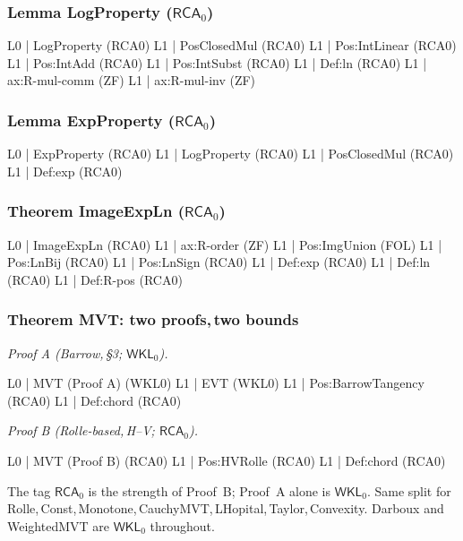 \documentclass[11pt,reqno]{amsart}
\newcommand{\comma}{,\,\allowbreak}
\theoremstyle{redplain}
\begin{document}
\subsubsection*{Lemma \textsf{LogProperty} ($\textsf{RCA}_0$)}
\begin{verbatimbox}
	L0 | LogProperty                      (RCA0)
	L1 |   PosClosedMul                   (RCA0)
	L1 |   Pos:IntLinear                  (RCA0)
	L1 |   Pos:IntAdd                     (RCA0)
	L1 |   Pos:IntSubst                   (RCA0)
	L1 |   Def:ln                         (RCA0)
	L1 |   ax:R-mul-comm                  (ZF)
	L1 |   ax:R-mul-inv                   (ZF)
\end{verbatimbox}

\subsubsection*{Lemma \textsf{ExpProperty} ($\textsf{RCA}_0$)}
\begin{verbatimbox}
	L0 | ExpProperty                      (RCA0)
	L1 |   LogProperty                    (RCA0)
	L1 |   PosClosedMul                   (RCA0)
	L1 |   Def:exp                        (RCA0)
\end{verbatimbox}

\subsubsection*{Theorem \textsf{ImageExpLn} ($\textsf{RCA}_0$)}
\begin{verbatimbox}
	L0 | ImageExpLn                       (RCA0)
	L1 |   ax:R-order                     (ZF)
	L1 |   Pos:ImgUnion                   (FOL)
	L1 |   Pos:LnBij                      (RCA0)
	L1 |   Pos:LnSign                     (RCA0)
	L1 |   Def:exp                        (RCA0)
	L1 |   Def:ln                         (RCA0)
	L1 |   Def:R-pos                      (RCA0)
\end{verbatimbox}

\subsubsection*{Theorem \textsf{MVT}: two proofs\comma two bounds}
\noindent\emph{Proof A (Barrow\comma \S 3; $\textsf{WKL}_0$).}
\begin{verbatimbox}
	L0 | MVT (Proof A)                    (WKL0)
	L1 |   EVT                            (WKL0)
	L1 |   Pos:BarrowTangency             (RCA0)
	L1 |   Def:chord                      (RCA0)
\end{verbatimbox}
\emph{Proof B (Rolle-based\comma H--V; $\textsf{RCA}_0$).}
\begin{verbatimbox}
	L0 | MVT (Proof B)                    (RCA0)
	L1 |   Pos:HVRolle                    (RCA0)
	L1 |   Def:chord                      (RCA0)
\end{verbatimbox}
\noindent The tag $\textsf{RCA}_0$ is the strength of Proof~B; Proof~A alone is $\textsf{WKL}_0$. Same split for Rolle\comma Const\comma Monotone\comma CauchyMVT\comma LHopital\comma Taylor\comma Convexity. Darboux and WeightedMVT are $\textsf{WKL}_0$ throughout.
\end{document}
